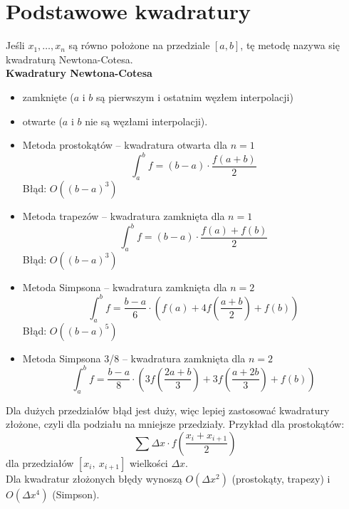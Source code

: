 \section{Podstawowe kwadratury}
Jeśli \( x_1, \dots, x_n \) są równo położone na przedziale \( [a, b] \), tę metodę nazywa się kwadraturą Newtona-Cotesa. \\
\textbf{Kwadratury Newtona-Cotesa}
\begin{itemize}
\onehalfspacing
    \item zamknięte (\( a \) i \( b \) są pierwszym i ostatnim węzłem interpolacji)
    \item otwarte (\( a \) i \( b \) nie są węzłami interpolacji).
\end{itemize}
\vspace{1.2em}

\begin{itemize}
\onehalfspacing
    \item Metoda prostokątów – kwadratura otwarta dla \( n = 1 \)
    \[
        \int_{a}^{b} f = (b-a) \cdot \frac{f(a+b)}{2}
    \]
    Błąd: \( O((b - a)^3) \)
    \item Metoda trapezów – kwadratura zamknięta dla \( n = 1 \)
    \[
        \int_{a}^{b} f = (b-a) \cdot \frac{f(a)+f(b)}{2}
    \]
    Błąd: \( O((b - a)^3) \)
    \item Metoda Simpsona – kwadratura zamknięta dla \( n = 2 \)
    \[
        \int_{a}^{b} f = \frac{b-a}{6} \cdot \left(f(a) + 4f\left(\frac{a+b}{2}\right) + f(b)\right)
    \]
    Błąd: \( O((b - a)^5) \)
    \item Metoda Simpsona 3/8 – kwadratura zamknięta dla \( n = 2 \)
    \[
        \int_{a}^{b} f = \frac{b-a}{8} \cdot \left(3f\left(\frac{2a+b}{3}\right) + 3f \left(\frac{a+2b}{3}\right) + f(b)\right)
    \]
\end{itemize}
Dla dużych przedziałów błąd jest duży, więc lepiej zastosować kwadratury złożone, czyli dla podziału na mniejsze przedziały. Przykład dla prostokątów:
\[
    \sum \Delta x \cdot f\left(\frac{x_i + x_{i+1}}{2}\right)
\]
dla przedziałów \( [x_i,\:x_{i+1}] \) wielkości \( \Delta x \). \\
Dla kwadratur złożonych błędy wynoszą \( O(\Delta x^2) \) (prostokąty, trapezy) i \( O(\Delta x^4) \) (Simpson).